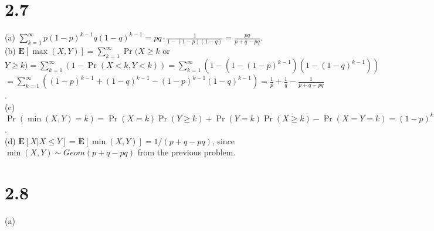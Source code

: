 \documentclass{article}
\begin{document}
\section*{2.7}
(a) $\sum\limits_{k=1}^\infty p(1-p)^{k-1}q(1-q)^{k-1}=pq\cdot\frac{1}{1-(1-p)(1-q)}=\frac{pq}{p+q-pq}$.\\
(b) $\textbf{E}[\max (X,Y)]=\sum\limits_{k=1}^\infty \Pr(X\geq k$ or $Y \geq k)=\sum\limits_{k=1}^\infty(1-\Pr(X<k,Y<k))=\sum\limits_{k=1}^\infty(1-(1-(1-p)^{k-1})(1-(1-q)^{k-1}))$\\
$=\sum\limits_{k=1}^\infty((1-p)^{k-1}+(1-q)^{k-1}-(1-p)^{k-1}(1-q)^{k-1})=\frac{1}{p}+\frac{1}{q}-\frac{1}{p+q-pq}$.\\
(c) $\Pr(\min(X,Y)=k)=\Pr(X=k)\Pr(Y\geq k)+\Pr(Y=k)\Pr(X\geq k)-\Pr(X=Y=k)=(1-p)^{k-1}(1-q)^{k-1}(p+q-pq)$.\\
(d) $\textbf{E}[X|X\leq Y]=\textbf{E}[\min(X,Y)]=1/(p+q-pq)$, since $\min(X,Y)\sim Geom(p+q-pq)$ from the previous problem.
\section*{2.8}
(a) 
\end{document}
